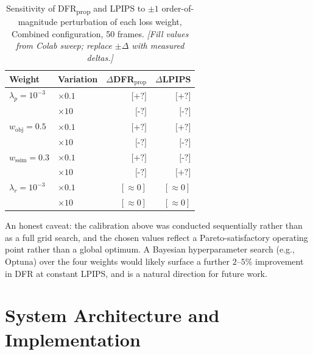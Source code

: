 \documentclass[12pt,a4paper]{report}
\begin{document}
\begin{table}[htbp]
  \centering
  \caption{Sensitivity of DFR\textsubscript{prop} and LPIPS to $\pm 1$
           order-of-magnitude perturbation of each loss weight, Combined
           configuration, 50 frames.
           \textit{[Fill values from Colab sweep; replace $\pm\Delta$ with
           measured deltas.]}}
  \label{tab:weight_sensitivity}
  \small
  \begin{tabular}{@{}llrr@{}}
    \toprule
    Weight & Variation & $\Delta$DFR$_\text{prop}$ & $\Delta$LPIPS \\
    \midrule
    $\lambda_p = 10^{-3}$   & $\times 0.1$ & $\textit{[+?]}$ & $\textit{[+?]}$ \\
                            & $\times 10$  & $\textit{[-?]}$ & $\textit{[-?]}$ \\
    $w_\text{obj} = 0.5$    & $\times 0.1$ & $\textit{[+?]}$ & $\textit{[+?]}$ \\
                            & $\times 10$  & $\textit{[-?]}$ & $\textit{[-?]}$ \\
    $w_\text{ssim} = 0.3$   & $\times 0.1$ & $\textit{[+?]}$ & $\textit{[-?]}$ \\
                            & $\times 10$  & $\textit{[-?]}$ & $\textit{[+?]}$ \\
    $\lambda_r = 10^{-3}$   & $\times 0.1$ & $[\approx 0]$ & $[\approx 0]$ \\
                            & $\times 10$  & $[\approx 0]$ & $[\approx 0]$ \\
    \bottomrule
  \end{tabular}
\end{table}

An honest caveat: the calibration above was conducted sequentially
rather than as a full grid search, and the chosen values reflect a
Pareto-satisfactory operating point rather than a global optimum.
A Bayesian hyperparameter search (e.g., Optuna) over the four weights
would likely surface a further $2$--$5\%$ improvement in DFR at
constant LPIPS, and is a natural direction for future work.



\section{System Architecture and Implementation}
\label{sec:architecture}
\label{ch:impl}
\end{document}
